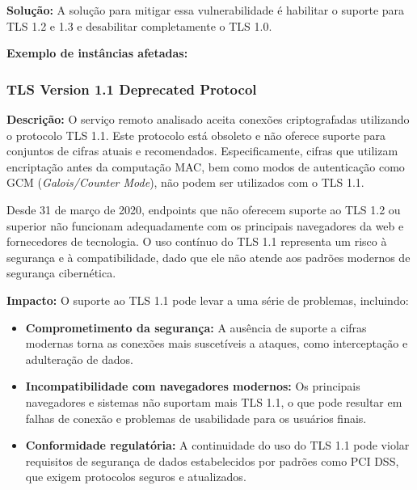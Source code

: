 \documentclass[a4paper,12pt]{article}
\begin{document}
\textbf{Solução:} A solução para mitigar essa vulnerabilidade é habilitar o suporte para TLS 1.2 e 1.3 e desabilitar completamente o TLS 1.0. 


\textbf{Exemplo de instâncias afetadas:}
\begin{itemize}
\end{itemize}





\subsubsection{TLS Version 1.1 Deprecated Protocol}

\textbf{Descrição:} O serviço remoto analisado aceita conexões criptografadas utilizando o protocolo TLS 1.1. Este protocolo está obsoleto e não oferece suporte para conjuntos de cifras atuais e recomendados. Especificamente, cifras que utilizam encriptação antes da computação MAC, bem como modos de autenticação como GCM (\textit{Galois/Counter Mode}), não podem ser utilizados com o TLS 1.1.

Desde 31 de março de 2020, endpoints que não oferecem suporte ao TLS 1.2 ou superior não funcionam adequadamente com os principais navegadores da web e fornecedores de tecnologia. O uso contínuo do TLS 1.1 representa um risco à segurança e à compatibilidade, dado que ele não atende aos padrões modernos de segurança cibernética.

\textbf{Impacto:} O suporte ao TLS 1.1 pode levar a uma série de problemas, incluindo:
\begin{itemize}
    \item \textbf{Comprometimento da segurança:} A ausência de suporte a cifras modernas torna as conexões mais suscetíveis a ataques, como interceptação e adulteração de dados.
    \item \textbf{Incompatibilidade com navegadores modernos:} Os principais navegadores e sistemas não suportam mais TLS 1.1, o que pode resultar em falhas de conexão e problemas de usabilidade para os usuários finais.
    \item \textbf{Conformidade regulatória:} A continuidade do uso do TLS 1.1 pode violar requisitos de segurança de dados estabelecidos por padrões como PCI DSS, que exigem protocolos seguros e atualizados.
\end{itemize}
\end{document}
